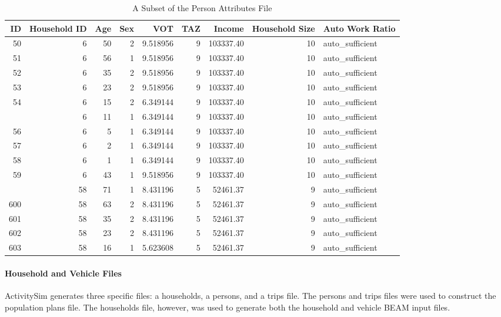 \documentclass[3p, authoryear, review]{elsarticle} %
\begin{document}
\begin{table}

\caption{\label{tab:peratt}A Subset of the Person Attributes File}
\centering
\begin{tabular}[t]{rrrrrrrrl}
\toprule
ID & Household ID & Age & Sex & VOT & TAZ & Income & Household Size & Auto Work Ratio\\
\midrule
50 & 6 & 50 & 2 & 9.518956 & 9 & 103337.40 & 10 & auto\_sufficient\\
51 & 6 & 56 & 1 & 9.518956 & 9 & 103337.40 & 10 & auto\_sufficient\\
52 & 6 & 35 & 2 & 9.518956 & 9 & 103337.40 & 10 & auto\_sufficient\\
53 & 6 & 23 & 2 & 9.518956 & 9 & 103337.40 & 10 & auto\_sufficient\\
54 & 6 & 15 & 2 & 6.349144 & 9 & 103337.40 & 10 & auto\_sufficient\\
\addlinespace
55 & 6 & 11 & 1 & 6.349144 & 9 & 103337.40 & 10 & auto\_sufficient\\
56 & 6 & 5 & 1 & 6.349144 & 9 & 103337.40 & 10 & auto\_sufficient\\
57 & 6 & 2 & 1 & 6.349144 & 9 & 103337.40 & 10 & auto\_sufficient\\
58 & 6 & 1 & 1 & 6.349144 & 9 & 103337.40 & 10 & auto\_sufficient\\
59 & 6 & 43 & 1 & 9.518956 & 9 & 103337.40 & 10 & auto\_sufficient\\
\addlinespace
599 & 58 & 71 & 1 & 8.431196 & 5 & 52461.37 & 9 & auto\_sufficient\\
600 & 58 & 63 & 2 & 8.431196 & 5 & 52461.37 & 9 & auto\_sufficient\\
601 & 58 & 35 & 2 & 8.431196 & 5 & 52461.37 & 9 & auto\_sufficient\\
602 & 58 & 23 & 2 & 8.431196 & 5 & 52461.37 & 9 & auto\_sufficient\\
603 & 58 & 16 & 1 & 5.623608 & 5 & 52461.37 & 9 & auto\_sufficient\\
\bottomrule
\end{tabular}
\end{table}

\hypertarget{household-and-vehicle-files}{%
\paragraph{Household and Vehicle Files}\label{household-and-vehicle-files}}

ActivitySim generates three specific files: a households, a persons, and a trips file. The persons and trips files were used to construct the population plans file. The households file, however, was used to generate both the household and vehicle BEAM input files.
\end{document}
